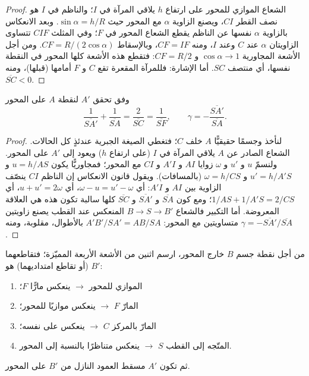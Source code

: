 \begin{proof}
الشعاع الموازي للمحور على ارتفاع $h$ يلاقي المرآة في $I$؛ والناظم في
$I$ هو نصف القطر $CI$، ويصنع الزاوية $\alpha$ مع
المحور حيث $\sin\alpha = h/R$. وبعد الانعكاس بالزاوية $\alpha$ نفسها عن
الناظم يقطع الشعاع المحور في $F$؛ وفي المثلث $CIF$ تتساوى
الزاويتان $\alpha$ عند $C$ وعند $I$، ومنه $CF = IF$، وبالإسقاط
$CF = R/(2\cos\alpha)$. ومن أجل الأشعة المجاورية $\cos\alpha \to 1$ و
$CF = R/2$: فتقطع هذه الأشعة كلها المحور في النقطة نفسها، أي
منتصف $SC$. أما الإشارة: فللمرآة المقعرة تقع $C$ و $F$ أمامها
(قبلها)، ومنه $\overline{SC} < 0$.
\end{proof}

\begin{theorem}\label{thm:b1:mirrors-thin-lenses:mirrorconj}
وفق  تحقق  $A'$ لنقطة $A$ على المحور
\[
\frac{1}{\overline{SA'}} + \frac{1}{\overline{SA}} = \frac{2}{\overline{SC}}
= \frac{1}{\overline{SF}},
\qquad
\gamma = -\frac{\overline{SA'}}{\overline{SA}} .
\]
\end{theorem}

\begin{proof}
لنأخذ  وجسمًا حقيقيًّا $A$ خلف $C$؛ فتغطي الصيغة الجبرية
عندئذٍ كل الحالات. الشعاع الصادر عن $A$ يلاقي المرآة في $I$
(على ارتفاع $h$) ويعود إلى $A'$ على المحور. ولنسمّ $u$ و $u'$ و $\omega$
زوايا $AI$ و $A'I$ و $CI$ مع المحور؛ فمجاوريًّا يكون
$u = h/AS$ و $u' = h/A'S$ و $\omega = h/CS$ (بالمسافات). ويقول قانون
الانعكاس إن الناظم $CI$ ينصّف الزاوية بين $AI$ و
$A'I$: أي $\omega - u = u' - \omega$، أي $u + u' = 2\omega$، أي
$1/AS + 1/A'S = 2/CS$؛ ومع كون $\overline{SA}$ و $\overline{SA'}$ و
$\overline{SC}$ كلها سالبة تكون هذه هي العلاقة المعروضة. أما
التكبير فالشعاع $B \to S \to B'$ المنعكس عند القطب يصنع
زاويتين متساويتين مع المحور: $A'B'/SA' = AB/SA$ بالأطوال، 
مقلوبة، ومنه $\gamma = -\overline{SA'}/\overline{SA}$.
\end{proof}

\begin{method}\label{met:b1:mirrors-thin-lenses:mirrorrays}
من أجل نقطة جسم $B$ خارج المحور، ارسم اثنين من الأشعة الأربعة
المميّزة؛ فتقاطعهما (أو تقاطع امتداديهما) هو $B'$:
\begin{enumerate}
  \item الموازي للمحور $\to$ ينعكس مارًّا  $F$؛
  \item المارّ  $F$ $\to$ ينعكس موازيًا للمحور؛
  \item المارّ بالمركز $C$ $\to$ ينعكس على نفسه؛
  \item المتّجه إلى القطب $S$ $\to$ ينعكس متناظرًا بالنسبة إلى المحور.
\end{enumerate}
ثم تكون $A'$ مسقط العمود النازل من $B'$ على المحور.
\end{method}

